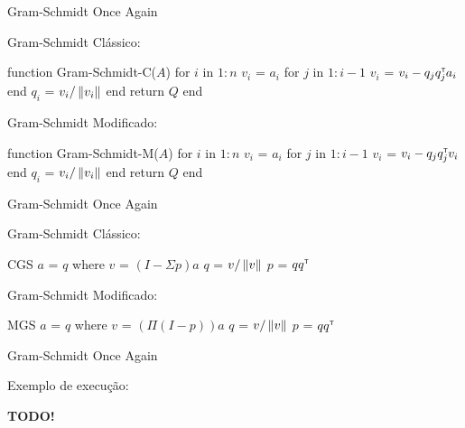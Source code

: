 
\begin{frame}[fragile]{Gram-Schmidt Once Again}
  \begin{minipage}[t]{0.45\textwidth}
    Gram-Schmidt Clássico:
    \vspace{0.2cm}
    \begin{code}
function Gram-Schmidt-C($A$)
    for $i$ in $1:n$
        $v_i$ = $a_i$
        for $j$ in $1:i-1$
            $v_i$ = $v_i - q_j q_j^{\scriptscriptstyle\mathsf{T}\mkern-1mu} a_i$
        end
        $q_i$ = $v_i / \left\lVert v_i\right\rVert$
    end
    return $Q$
end
    \end{code}
  \end{minipage}
  \pause
  \hfill
  \vrule
  \hfill
  \begin{minipage}[t]{0.50\textwidth}
    Gram-Schmidt Modificado:
    \vspace{0.2cm}
    \begin{code}
function Gram-Schmidt-M($A$)
    for $i$ in $1:n$
        $v_i$ = $a_i$
        for $j$ in $1:i-1$
            $v_i$ = $v_i - q_j q_j^{\scriptscriptstyle\mathsf{T}\mkern-1mu} v_i$
        end
        $q_i$ = $v_i / \left\lVert v_i\right\rVert$
    end
    return $Q$
end
    \end{code}
  \end{minipage}
  \vfill
\end{frame}

\begin{frame}[fragile]{Gram-Schmidt Once Again}
  \begin{minipage}[t]{0.45\textwidth}
    Gram-Schmidt Clássico:
    \vspace{0.2cm}
    \begin{code}
CGS $a$ = $q$
    where
        $v$ = $(I - \Sigma p) a$
        $q$ = $v / \left\lVert v\right\rVert$
        $p$ = $qq^{\scriptscriptstyle\mathsf{T}\mkern-1mu}$
    \end{code}
  \end{minipage}
  \pause
  \hfill
  \vrule
  \hfill
  \begin{minipage}[t]{0.50\textwidth}
    Gram-Schmidt Modificado:
    \vspace{0.2cm}
    \begin{code}
MGS $a$ = $q$
    where
        $v$ = $(\Pi (I - p)) a$
        $q$ = $v / \left\lVert v\right\rVert$
        $p$ = $qq^{\scriptscriptstyle\mathsf{T}\mkern-1mu}$
    \end{code}
  \end{minipage}
  \vfill
\end{frame}

\begin{frame}[fragile]{Gram-Schmidt Once Again}
  \begin{center}
    Exemplo de execução:
  \end{center}

  \textbf{TODO!}
\end{frame}

